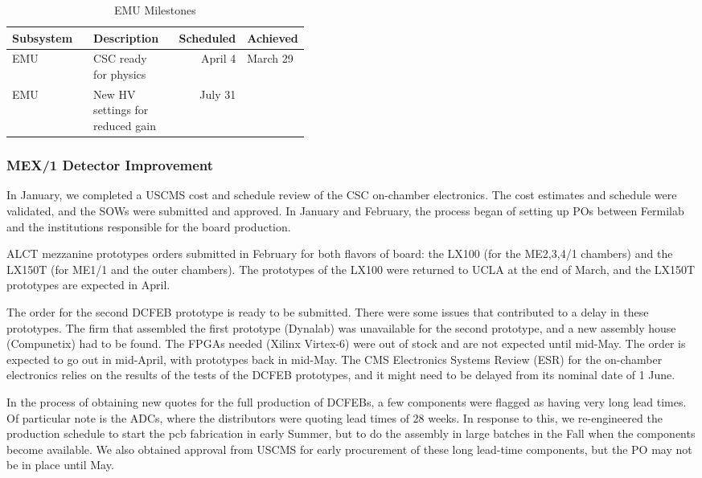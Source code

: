 \documentclass[12pt]{article}
\begin{document}
 \begin{table}[htp]
\caption{EMU Milestones}
\begin{center}
\def\arraystretch{1.5}

\begin{tabular}{|l|p{0.25\linewidth}|r|p{0.18\linewidth}|}
\hline
Subsystem&Description&Scheduled&Achieved\\
\hline
EMU& \raggedright{CSC ready for physics}& April 4 & March 29 \\
\hline
EMU & New HV settings for reduced gain & July 31 &  \\
\hline
\end{tabular}
\end{center}
\label{EMUMilestones}
\end{table}%

\subsubsection{MEX/1 Detector Improvement}

In January, we completed a USCMS cost and schedule review of the CSC on-chamber electronics.  The cost estimates and schedule were validated, and the SOWs were submitted and approved.  In January and February, the process began of setting up POs between Fermilab and the institutions responsible for the board production.

ALCT mezzanine prototypes orders submitted in February for both flavors of board: the LX100 (for the ME2,3,4/1 chambers) and the LX150T (for ME1/1 and the outer chambers).  The prototypes of the LX100 were returned to UCLA at the end of March, and the LX150T prototypes are expected in April.

The order for the second DCFEB prototype is ready to be submitted.  There were some issues that contributed to a delay in these prototypes.  The firm that assembled the first prototype (Dynalab) was unavailable for the second prototype, and a new assembly house (Compunetix) had to be found.  The FPGAs needed (Xilinx Virtex-6) were out of stock and are not expected until mid-May.   The order is expected to go out in mid-April, with prototypes back in mid-May.  The CMS Electronics Systems Review (ESR) for the on-chamber electronics relies on the results of the tests of the DCFEB prototypes, and it might need to be delayed from its nominal date of 1 June.

In the process of obtaining new quotes for the full production of DCFEBs, a few components were flagged as having very long lead times.  Of particular note is the ADCs, where the distributors were quoting lead times of 28 weeks.  In response to this, we re-engineered the production schedule to start the pcb fabrication in early Summer, but to do the assembly in large batches in the Fall when the components become available.  We also obtained approval from USCMS for early procurement of these long lead-time components, but the PO may not be in place until May.
\end{document}
